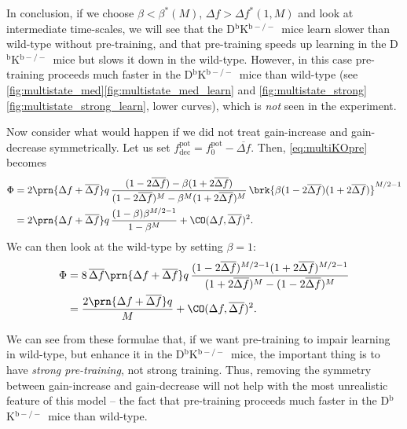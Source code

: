 \documentclass[12pt]{article}
\newcommand{\pot}{^{\text{pot}}}
\newcommand{\norm}{_0}
\newcommand{\dec}{_{\text{dec}}}
\newcommand{\KO}{D$^\mathrm{b}$K$^{\mathrm{b}-/-}$}
\begin{document}
In conclusion, if we choose $\beta<\beta^*(M)$, $\Delta f > \Delta f^*(1,M)$ and look at intermediate time-scales, we will see that the \KO\ mice learn slower than wild-type without pre-training, and that pre-training speeds up learning in the \KO\ mice but slows it down in the wild-type.
However, in this case pre-training proceeds much faster in the \KO\ mice than wild-type (see \autoref{fig:multistate_med}\ref{fig:multistate_med_learn} and \autoref{fig:multistate_strong}\ref{fig:multistate_strong_learn}, lower curves), which is \emph{not} seen in the experiment.

Now consider what would happen if we did not treat gain-increase and gain-decrease symmetrically.
Let us set $f\pot\dec = f\pot\norm - \overline{\Delta f}$.
Then, \eqref{eq:multiKOpre} becomes
%
\begin{equation}\label{eq:multiKOdiffpre}
\begin{aligned}
  \Phi &= 2\prn{\Delta f + \overline{\Delta f}} q \, \frac{(1-2\overline{\Delta f}) - \beta(1+2\overline{\Delta f})}
          {(1-2\overline{\Delta f})^M - \beta^M(1+2\overline{\Delta f})^M}   \,
          \brk{\beta (1-2\overline{\Delta f}) (1+2\overline{\Delta f})}^{M/2-1} \\
       &= 2\prn{\Delta f + \overline{\Delta f}} q\,\frac{(1-\beta)\beta^{M/2-1}}{1-\beta^M} + \CO(\Delta f,\overline{\Delta f})^2.
\end{aligned}
\end{equation}
%
We can then look at the wild-type by setting $\beta=1$:
%
\begin{equation}\label{eq:multiWTdiffpre}
\begin{aligned}
  \Phi &= 8\,\overline{\Delta f}\prn{\Delta f + \overline{\Delta f}} q \,
          \frac{(1-2\overline{\Delta f})^{M/2-1} (1+2\overline{\Delta f})^{M/2-1} }
          {{(1+2\overline{\Delta f})^M - (1-2\overline{\Delta f})^M}}   \\
       &= \frac{2\prn{\Delta f + \overline{\Delta f}} q}{M} + \CO(\Delta f,\overline{\Delta f})^2.
\end{aligned}
\end{equation}
%

We can see from these formulae that, if we want pre-training to impair learning in wild-type, but enhance it in the \KO\ mice, the important thing is to have \emph{strong pre-training}, not strong training.
Thus, removing the symmetry between gain-increase and gain-decrease will not help with the most unrealistic feature of this model -- the fact that pre-training proceeds much faster in the \KO\ mice than wild-type.
\end{document}
